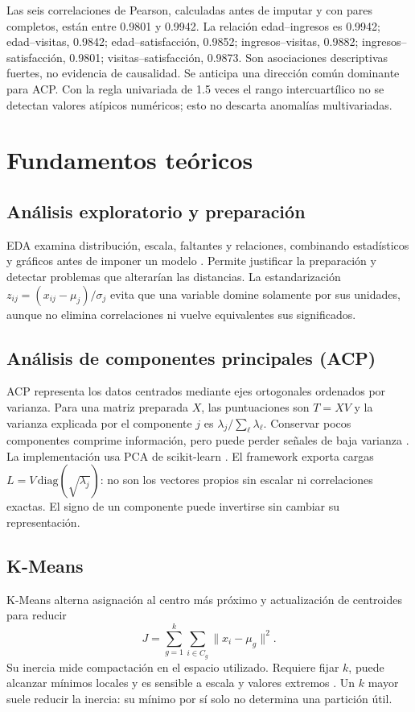 \documentclass[11pt]{article}
\begin{document}
Las seis correlaciones de Pearson, calculadas antes de imputar y con pares
completos, están entre 0.9801 y 0.9942. La relación edad--ingresos es 0.9942;
edad--visitas, 0.9842; edad--satisfacción, 0.9852;
ingresos--visitas, 0.9882; ingresos--satisfacción, 0.9801;
visitas--satisfacción, 0.9873. Son asociaciones descriptivas fuertes, no
evidencia de causalidad. Se anticipa una dirección común dominante para ACP.
Con la regla univariada de 1.5 veces el rango intercuartílico no se detectan
valores atípicos numéricos; esto no descarta anomalías multivariadas.
\FloatBarrier
\clearpage

\section{Fundamentos teóricos}
\subsection{Análisis exploratorio y preparación}
EDA examina distribución, escala, faltantes y relaciones, combinando
estadísticos y gráficos antes de imponer un modelo \cite{nisteda}.
Permite justificar la preparación y detectar problemas que alterarían las
distancias. La estandarización $z_{ij}=(x_{ij}-\mu_j)/\sigma_j$ evita que una
variable domine solamente por sus unidades, aunque no elimina correlaciones
ni vuelve equivalentes sus significados.

\subsection{Análisis de componentes principales (ACP)}
ACP representa los datos centrados mediante ejes ortogonales ordenados por
varianza. Para una matriz preparada $X$, las puntuaciones son $T=XV$ y la
varianza explicada por el componente $j$ es
$\lambda_j/\sum_\ell\lambda_\ell$. Conservar pocos componentes comprime
información, pero puede perder señales de baja varianza \cite{jolliffe2002,jolliffecadima}.
La implementación usa PCA de scikit-learn \cite{sklearnpca}.
El framework exporta cargas $L=V\,\mathrm{diag}(\sqrt{\lambda_j})$:
no son los vectores propios sin escalar ni correlaciones exactas.
El signo de un componente puede invertirse sin cambiar su representación.

\subsection{K-Means}
K-Means alterna asignación al centro más próximo y actualización de
centroides para reducir
\[
  J=\sum_{g=1}^{k}\sum_{i\in C_g}\lVert x_i-\mu_g\rVert^2.
\]
Su inercia mide compactación en el espacio utilizado. Requiere fijar $k$,
puede alcanzar mínimos locales y es sensible a escala y valores extremos
\cite{macqueen1967,sklearnkmeans}. Un $k$ mayor suele reducir la inercia:
su mínimo por sí solo no determina una partición útil.
\end{document}
